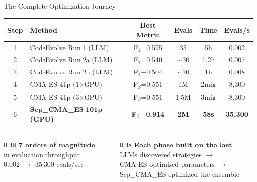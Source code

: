 \documentclass[aspectratio=169,12pt]{beamer}
\begin{document}
\begin{frame}{The Complete Optimization Journey}
  {\small
  \begin{table}
    \centering
    \begin{tabular}{@{}clcccc@{}}
      \toprule
      Step & Method & Best Metric & Evals & Time & Evals/s \\
      \midrule
      1 & CodeEvolve Run 1 (LLM) & F$_1$=0.595 & 35 & 5h & 0.002 \\
      2 & CodeEvolve Run 2a (LLM) & F$_1$=0.540 & $\sim$30 & 1.2h & 0.007 \\
      3 & CodeEvolve Run 2b (LLM) & F$_1$=0.504 & $\sim$30 & 1h & 0.008 \\
      \midrule
      4 & CMA-ES 41p (1$\times$GPU) & F$_\beta$=0.551 & 1M & 2min & 8{,}300 \\
      5 & CMA-ES 41p (3$\times$GPU) & F$_\beta$=0.551 & 1.5M & 3min & 8{,}300 \\
      \midrule
      \rowcolor{cbGreen!15}
      6 & \textbf{Sep\_CMA\_ES 101p (GPU)} & \textbf{F$_\beta$=0.914} & \textbf{2M} & \textbf{58s} & \textbf{35{,}300} \\
      \bottomrule
    \end{tabular}
  \end{table}
  }

  \vspace{0.5em}
  \begin{columns}[T]
    \begin{column}{0.48\textwidth}
      \centering
      \textbf{7 orders of magnitude}\\
      in evaluation throughput\\
      {\small 0.002 $\to$ 35{,}300 evals/sec}
    \end{column}
    \begin{column}{0.48\textwidth}
      \centering
      \textbf{Each phase built on the last}\\
      {\small LLMs discovered strategies $\to$\\
       CMA-ES optimized parameters $\to$\\
       Sep\_CMA\_ES optimized the ensemble}
    \end{column}
  \end{columns}
\end{frame}
\end{document}
